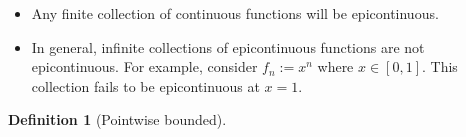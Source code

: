 \documentclass[11pt]{article}
\theoremstyle{definition}
\theoremstyle{definition}
\theoremstyle{definition}
\newtheorem{definition}{\textcolor{OliveGreen}{Definition}}
\theoremstyle{remark}
\begin{document}
\begin{itemize}[noitemsep]
	\item Any finite collection of continuous functions will be epicontinuous. 
	\item In general, infinite collections of epicontinuous functions are not epicontinuous. For example, consider $f_n := x^n$ where $x \in [0,1]$. This collection fails to be epicontinuous at $x=1$. 
\end{itemize}

\begin{definition}[Pointwise bounded] 
	
\end{definition}
\end{document}
